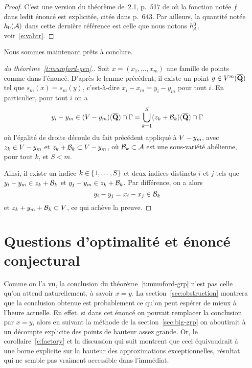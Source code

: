 \begin{proof}
  C'est une version du théorème de~2.1, p.~517 de \cite{remdcl} où la fonction
  notée \( f \) dans ledit énoncé est explicitée, citée dans \cite{daphimhva2}
  p.~643. Par ailleurs, la quantité notée \( h_0(\mathcal A) \) dans cette dernière
  référence est celle que nous notons \( h^{0}_{\!\mathcal A} \), voir~\eqref{e:vahtr}.
\end{proof}

Nous sommes maintenant prêts à conclure.

\begin{proof}[\proofname{} du théorème~\vref{t:mumford-gen}.]
  Soit \( x = (x_1, \dots, x_m) \) une famille de points comme dans l'énoncé.
  D'après le lemme précédent, il existe un point \( y \in V^m(\overline{{\mathbf{Q}}}) \)
  tel que \( s_m(x) = s_m(y) \), c'est-à-dire \( x_i - x_m = y_i - y_m \) pour
  tout \( i \). En particulier, pour tout \( i \) on a
  \begin{equation}
    y_i - y_m
    \in
    (V - y_m)(\overline{{\mathbf{Q}}}) \cap \Gamma
    =
    \bigcup_{k=1}^{S} (z_k + \mathcal B_k)(\overline{{\mathbf{Q}}}) \cap \Gamma
  \end{equation}
  où l'égalité de droite découle du fait précédent appliqué à \( V - y_m
  \), avec \( z_k \in V - y_m \) et \( z_k + \mathcal B_k \subset V - y_m
  \), où \( \mathcal B_k \subset \mathcal A \) est une sous-variété abélienne, pour tout \(
    k \), et \( S < m \).

  Ainsi, il existe un indice \( k \in \lbrace1, \dots, S\rbrace \) et deux indices
  distincts \( i \) et \( j \) tels que \( y_i - y_m \in z_k + \mathcal B_k \) et \(
    y_j - y_m \in z_k + \mathcal B_k \). Par différence, on a alors
  \begin{equation}
    y_i - y_j = x_i - x_j \in \mathcal B_k
  \end{equation}
  et \( z_k + y_m + \mathcal B_k \subset V \), ce qui achève la preuve.
\end{proof}



\section{Questions d'optimalité et énoncé conjectural}
\label{sec:mum-conj}

Comme on l'a vu, la conclusion du théorème~\vref{t:mumford-grp} n'est pas
celle qu'on attend naturellement, à savoir \( x = y \). La
section~\vref{sec:obstruction} montrera que la conclusion obtenue est
probablement ce qu'on peut espérer de mieux à l'heure actuelle. En effet, si
dans cet énoncé on pouvait remplacer la conclusion par \( x = y \), alors en
suivant la méthode de la section~\vref{sec:big-grp} on aboutirait à un
décompte explicite des points de hauteur assez grande. Or, le
corollaire~\vref{c:factory} et la discussion qui suit montrent que ceci
équivaudrait à une borne explicite sur la hauteur des approximations
exceptionnelles, résultat qui ne semble pas vraiment accessible dans
l'immédiat.

